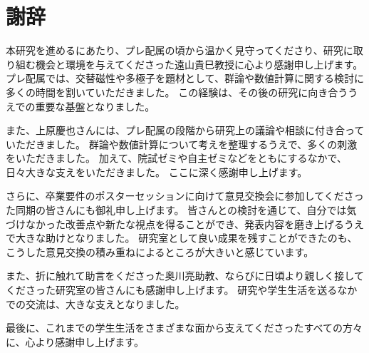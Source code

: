 \documentclass[../master.tex]{subfiles}
\begin{document}
\chapter*{謝辞}

本研究を進めるにあたり、プレ配属の頃から温かく見守ってくださり、研究に取り組む機会と環境を与えてくださった遠山貴巳教授に心より感謝申し上げます。
プレ配属では、交替磁性や多極子を題材として、群論や数値計算に関する検討に多くの時間を割いていただきました。
この経験は、その後の研究に向き合ううえでの重要な基盤となりました。

また、上原慶也さんには、プレ配属の段階から研究上の議論や相談に付き合っていただきました。
群論や数値計算について考えを整理するうえで、多くの刺激をいただきました。
加えて、院試ゼミや自主ゼミなどをともにするなかで、日々大きな支えをいただきました。
ここに深く感謝申し上げます。

さらに、卒業要件のポスターセッションに向けて意見交換会に参加してくださった同期の皆さんにも御礼申し上げます。
皆さんとの検討を通じて、自分では気づけなかった改善点や新たな視点を得ることができ、発表内容を磨き上げるうえで大きな助けとなりました。
研究室として良い成果を残すことができたのも、こうした意見交換の積み重ねによるところが大きいと感じています。

また、折に触れて助言をくださった奥川亮助教、ならびに日頃より親しく接してくださった研究室の皆さんにも感謝申し上げます。
研究や学生生活を送るなかでの交流は、大きな支えとなりました。

最後に、これまでの学生生活をさまざまな面から支えてくださったすべての方々に、心より感謝申し上げます。
\end{document}
